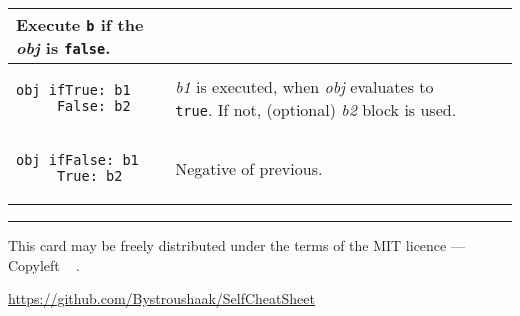 \documentclass[10pt]{article}
\begin{document}
\begin{multicols*}{3}
\begin{tabular}{ p{70pt} p{140pt} l l }
Execute \texttt{b} if the \textit{obj} is \texttt{false}.

\\\hline %

\begin{lstlisting}
obj ifTrue: b1
     False: b2
\end{lstlisting}
&\vspace*{0.1cm}

\textit{b1} is executed, when \textit{obj} evaluates to \texttt{true}.
If not, (optional) \textit{b2} block is used.

\\\hline %

\begin{lstlisting}
obj ifFalse: b1
     True: b2
\end{lstlisting}
&\vspace*{0.4cm}

Negative of previous.

\\\hline %

\end{tabular}





\vfill \hrule\smallskip
{\small This card may be freely distributed under
the terms of the MIT licence ---
Copyleft \textcopyleft\ \thedate{} \href{http://kitakitsune.org}{\theauthor}.

\url{https://github.com/Bystroushaak/SelfCheatSheet}
}

\end{multicols*}
\end{document}

